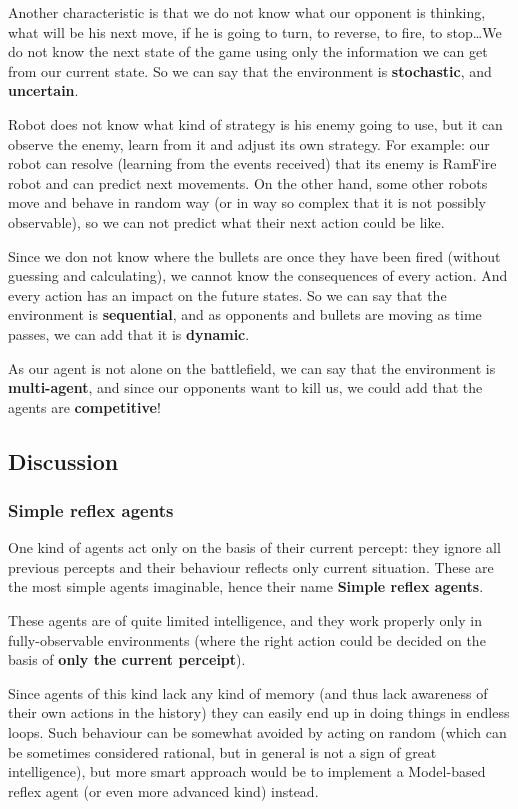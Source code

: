 \documentclass{article}
\begin{document}
Another characteristic is that we do not know what our opponent is thinking, what
will be his next move, if he is going to turn, to reverse, to fire, to stop\ldots We
do not know the next state of the game using only the information we can get from
our current state. So we can say that the environment is \textbf{stochastic}, and
\textbf{uncertain}.

Robot does not know what kind of strategy is his enemy going to use, but it can
observe the enemy, learn from it and adjust its own strategy. For example: our
robot can resolve (learning from the events received) that its enemy is RamFire
robot and can predict next movements. On the other hand, some other robots move
and behave in random way (or in way so complex that it is not possibly
observable), so we can not predict what their next action could be like.

Since we don not know where the bullets are once they have been fired (without
guessing and calculating), we cannot know the consequences of every action. And
every action has an impact on the future states. So we can say that the
environment is \textbf{sequential}, and as opponents and bullets are moving as
time passes, we can add that it is \textbf{dynamic}.

As our agent is not alone on the battlefield, we can say that the environment is
\textbf{multi-agent}, and since our opponents want to kill us, we could add that the
agents are \textbf{competitive}!

\subsection{Discussion}

\subsubsection{Simple reflex agents}

One kind of agents act only on the basis of their current percept: they ignore
all previous percepts and their behaviour reflects only current situation. These
are the most simple agents imaginable, hence their name \textbf{Simple reflex agents}.

These agents are of quite limited intelligence, and they work properly only in
fully-observable environments (where the right action could be decided on the
basis of \textbf{only the current perceipt}).

Since agents of this kind lack any kind of memory (and thus lack awareness of
their own actions in the history) they can easily end up in doing things in
endless loops. Such behaviour can be somewhat avoided by acting on random (which
can be sometimes considered rational, but in general is not a sign of great
intelligence), but more smart approach would be to implement a Model-based
reflex agent (or even more advanced kind) instead.
\end{document}
